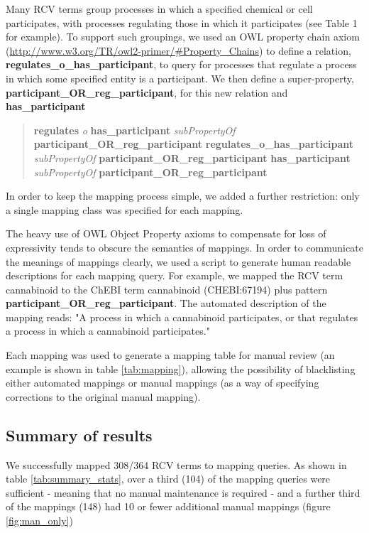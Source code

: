 \documentclass[runningheads,a4paper]{llncs}
\begin{document}
{{Many RCV terms group processes in which a specified chemical or cell participates, with processes regulating those in which it participates (see Table 1 for example). To support such groupings, we used an OWL property chain axiom (\url{http://www.w3.org/TR/owl2-primer/#Property_Chains}) to define a relation, \textbf{regulates\_o\_has\_participant}, to query for processes that regulate a process in which some specified entity is a participant. We then define a super-property, \textbf{participant\_OR\_reg\_participant}, for this new relation and \textbf{has\_participant}

\begin{quote} %
\textbf{regulates} \textit{o} \textbf{has\_participant} \textit{subPropertyOf}
\textbf{participant\_OR\_reg\_participant}
\textbf{regulates\_o\_has\_participant} \textit{subPropertyOf} \textbf{participant\_OR\_reg\_participant}
\textbf{has\_participant} \textit{subPropertyOf} \textbf{participant\_OR\_reg\_participant}
\end{quote}

In order to keep the mapping process simple, we added a further restriction: only a single mapping class was specified for each mapping.

The heavy use of OWL Object Property axioms to compensate for loss of expressivity tends to obscure the semantics of mappings. In order to communicate the meanings of mappings clearly, we used a script to generate human readable descriptions for each mapping query.  For example, we mapped the RCV term cannabinoid to the ChEBI term cannabinoid (CHEBI:67194) plus pattern \textbf{participant\_OR\_reg\_participant}.  The automated description of the mapping reads:  "A process in which a cannabinoid participates, or that regulates a process in which a cannabinoid participates."

Each mapping was used to generate a mapping table for manual review (an example is shown in table \ref{tab:mapping}), allowing the possibility of blacklisting either automated mappings or manual mappings (as a way of specifying corrections to the original manual mapping).

\subsection{Summary of results}

We successfully mapped 308/364 RCV terms to mapping queries.  As shown in table \ref{tab:summary_stats}, over a third (104) of the mapping queries were sufficient - meaning that no manual maintenance is required - and a further third of the mappings (148) had 10 or fewer additional manual mappings (figure \ref{fig:man_only})

}}
\end{document}

